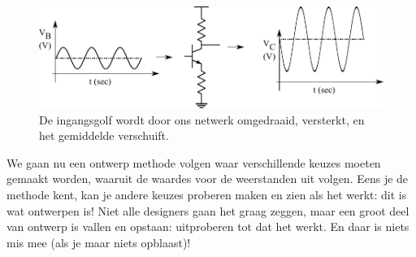 \documentclass{article}
\begin{document}
				\begin{figure}[htbp]
					\centering
					\includegraphics{golven}
					\caption{De ingangsgolf wordt door ons netwerk omgedraaid, versterkt, en het gemiddelde verschuift.}
					\label{fig:golven}
				\end{figure}

				We gaan nu een ontwerp methode volgen waar verschillende keuzes moeten gemaakt worden, waaruit de waardes voor de weerstanden uit volgen. Eens je de methode kent, kan je andere keuzes proberen maken en zien als het werkt: dit is wat ontwerpen is! Niet alle designers gaan het graag zeggen, maar een groot deel van ontwerp is vallen en opstaan: uitproberen tot dat het werkt. En daar is niets mis mee (als je maar niets opblaast)!
\end{document}
